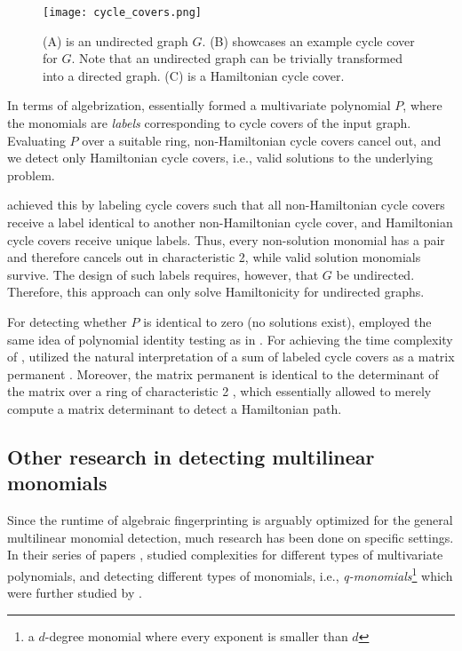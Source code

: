 \begin{figure}[h]
  \texttt{[image: cycle\_covers.png]}
  \centering
  \caption{(A) is an undirected graph $G$. (B) showcases an example cycle cover for $G$. 
  Note that an undirected graph can be trivially transformed into a directed graph. 
  (C) is a Hamiltonian cycle cover.}
  \label{fig:cycle_covers}
\end{figure}

In terms of algebrization, 
\citeauthor{Björklund14} essentially formed 
a multivariate polynomial $P$, where the monomials are 
\emph{labels} corresponding 
to cycle covers of the input graph. Evaluating $P$ over a suitable ring, 
non-Hamiltonian cycle covers cancel out, and we detect 
only Hamiltonian cycle covers, i.e., valid solutions to the underlying problem.

\citeauthor{Björklund14} achieved this by labeling cycle covers such 
that all non-Hamiltonian cycle covers receive a label identical 
to another non-Hamiltonian cycle cover, 
and Hamiltonian cycle covers receive unique labels. 
Thus, every non-solution monomial has a pair and therefore 
cancels out in characteristic 2, while valid solution monomials survive. 
The design of such labels requires, however, that $G$ be undirected. 
Therefore, this approach can only solve Hamiltonicity for undirected graphs.

For detecting whether $P$ is identical to zero (no solutions exist), \citeauthor{Björklund14} 
employed the same idea of polynomial identity testing as in .
For achieving the time complexity of , \citeauthor{Björklund14} 
utilized the natural interpretation of a sum of labeled cycle covers as 
a matrix permanent \cite{Björklund14}. 
Moreover, the matrix permanent
is identical to the determinant of the matrix 
over a ring of characteristic 2 \cite{Björklund14}, 
which essentially allowed \citeauthor{Björklund14} to merely compute a matrix determinant 
to detect a Hamiltonian path.

\subsection{Other research in detecting multilinear monomials}
\label{sect:other_improvements}

Since the runtime of algebraic fingerprinting is arguably optimized for 
the general multilinear monomial detection, much research has been 
done on specific settings. In their series of papers \cite{Chen11a, Chen11b, Chen10, Chen13a}, 
\citeauthor{Chen13a} studied complexities for different types of multivariate polynomials, and
detecting different types of monomials, i.e., 
\emph{q-monomials}\footnote{a $d$-degree monomial where every exponent is smaller than $d$} 
which were further studied by \textcite{Chen14}.

